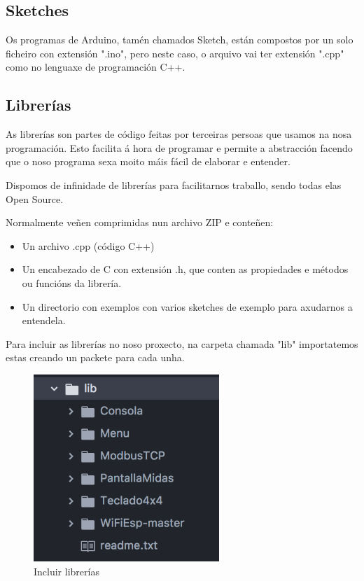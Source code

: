 \documentclass[11pt,twoside]{book}
\begin{document}
\subsection{Sketches}

Os programas de Arduino, tamén chamados Sketch, están compostos por un solo ficheiro con extensión ".ino", pero neste caso, o arquivo vai ter extensión ".cpp" como no lenguaxe de programación C++.

\subsection{Librerías}

As librerías son partes de código feitas por terceiras persoas que usamos na nosa programación. Esto facilita á hora de programar e permite a abstracción facendo que o noso programa sexa moito máis fácil de elaborar e entender.

Dispomos de infinidade de librerías para facilitarnos traballo, sendo todas elas Open Source.

Normalmente veñen comprimidas nun archivo ZIP e conteñen:
\begin{itemize}
\item Un archivo .cpp (código C++)
\item Un encabezado de C con extensión .h, que conten as propiedades e métodos ou funcións da librería.
\item Un directorio con exemplos con varios sketches de exemplo para axudarnos a entendela.
\end{itemize}

Para incluir as librerías no noso proxecto, na carpeta chamada "lib" importatemos estas creando un packete para cada unha.

\begin{figure}[H]
	\begin{center}
		\includegraphics[width=7cm]{images/librerias.png}
	\end{center}
	\caption{Incluir librerías}
	\label{fig:LibreriasAtom}
\end{figure}
\end{document}
